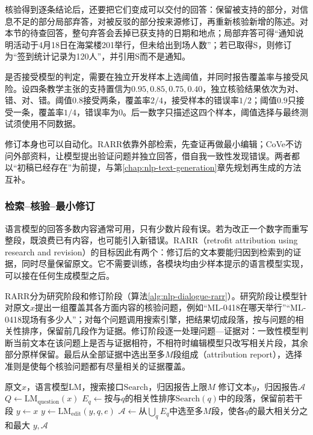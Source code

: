核验得到逐条结论后，还要把它们变成可以交付的回答：保留被支持的部分，对信息不足的部分局部弃答，对被反驳的部分按来源修订，再重新核验新增的陈述。对本节的待查回答，整句弃答会丢掉已获支持的日期和地点；局部弃答可得“通知说明活动于4月18日在海棠楼201举行，但未给出到场人数”；若已取得S，则修订为“签到统计记录为120人”，并引用S而不是通知。

是否接受模型的判定，需要在独立开发样本上选阈值，并同时报告覆盖率与接受风险。设四条教学主张的支持置信为$0.95,0.85,0.75,0.40$，独立核验结果依次为对、错、对、错。阈值$0.8$接受两条，覆盖率$2/4$，接受样本的错误率$1/2$；阈值$0.9$只接受一条，覆盖率$1/4$，错误率为0。后一数字只描述这四个样本，阈值选择与最终测试须使用不同数据。

修订本身也可以自动化。RARR依靠外部检索，先查证再做最小编辑；CoVe不访问外部资料，让模型提出验证问题并独立回答，借自我一致性发现错误。两者都以“初稿已经存在”为前提，与第\ref{chap:nlp-text-generation}章先规划再生成的方法互补。

\subsubsection{检索–核验–最小修订}
\label{sec:nlp-dialogue-rarr}

语言模型的回答多数内容通常可用，只有少数片段有误。若为改正一个数字而重写整段，既浪费已有内容，也可能引入新错误。RARR（retrofit attribution using research and revision）的目标因此有两个：修订后的文本要能归因到检索到的证据，同时尽量保留原文。它不需要训练，各模块均由少样本提示的语言模型实现，可以接在任何生成模型之后。

RARR分为研究阶段和修订阶段（算法\ref{alg:nlp-dialogue-rarr}）。研究阶段让模型针对原文$x$提出一组覆盖其各方面内容的核验问题，例如“ML-0418在哪天举行”“ML-0418现场有多少人”；对每个问题调用搜索引擎，把结果切成段落，按与问题的相关性排序，保留前几段作为证据。修订阶段逐一处理问题—证据对：一致性模型判断当前文本在该问题上是否与证据相符，不相符时编辑模型只改写相关片段，其余部分原样保留。最后从全部证据中选出至多$M$段组成（attribution report），选择准则是使每个核验问题都有尽量相关的证据覆盖。

\begin{algorithm}
  \label{alg:nlp-dialogue-rarr}
  \begin{algorithmic}[1]
    \Require 原文$x$，语言模型$\mathrm{LM}$，搜索接口$\mathrm{Search}$，归因报告上限$M$
    \Ensure 修订文本$y$，归因报告$\mathcal{A}$
    \State $Q\gets\mathrm{LM}_{\mathrm{question}}(x)$
      \State $E_q\gets$按与$q$的相关性排序$\mathrm{Search}(q)$中的段落，保留前若干段
    \EndFor
    \State $y\gets x$
        \State $y\gets\mathrm{LM}_{\mathrm{edit}}(y,q,e)$
      \EndIf
    \EndFor
    \State $\mathcal{A}\gets$从$\bigcup_qE_q$中选至多$M$段，使各$q$的最大相关分之和最大
    \State \Return $y,\mathcal{A}$
  \end{algorithmic}
\end{algorithm}

